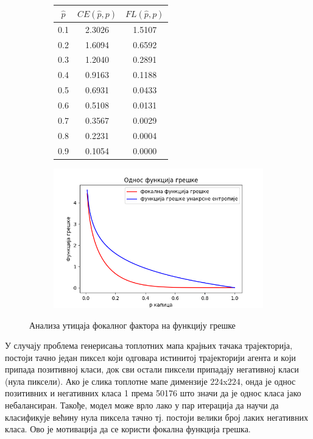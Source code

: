 \documentclass[11pt,oneside]{memoir}
\begin{document}
\begin{figure}[H]
  \centering
  \begin{subfigure}{5cm}
    \begin{table}[H]
      \begin{tabular}{c|c|c}
        $\hat{p}$ & $CE(\hat{p}, p)$ & $FL(\hat{p}, p)$ \\
        \hline
        0.1 & 2.3026 & 1.5107 \\
        0.2 & 1.6094 & 0.6592 \\
        0.3 & 1.2040 & 0.2891 \\
        0.4 & 0.9163 & 0.1188 \\
        0.5 & 0.6931 & 0.0433 \\
        0.6 & 0.5108 & 0.0131 \\
        0.7 & 0.3567 & 0.0029 \\
        0.8 & 0.2231 & 0.0004 \\
        0.9 & 0.1054 & 0.0000    
      \end{tabular}
    \end{table}
  \end{subfigure}
  \begin{subfigure}{7cm}
    \includegraphics[width=1.0\textwidth]{images/fl_vs_ce.png}
  \end{subfigure}
  \caption{Анализа утицаја фокалног фактора на функцију грешке \label{fl-table}}
\end{figure}

У случају проблема генерисања топлотних мапа крајњих тачака трајекторија, постоји тачно један пиксел који одговара истинитој трајекторији
агента и који припада позитивној класи, док сви остали пиксели припадају негативној класи (нула пиксели). Ако је слика топлотне мапе димензије 
$224$x$224$, онда је однос позитивних и негативних класа
1 према 50176 што значи да је однос класа јако небалансиран. Такође, модел може врло лако у пар итерација да научи
да класификује већину нула пиксела тачно тј. постоји велики број лаких негативних класа. Ово је мотивација да се користи фокална функција грешка.
\end{document}
